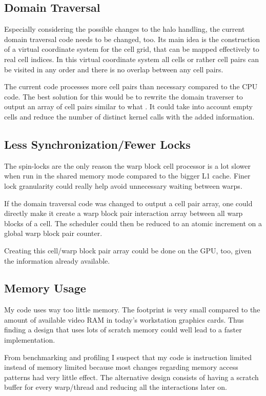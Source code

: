 \subsection{Domain Traversal}
Especially considering the possible changes to the halo handling, the current domain traversal code needs to be changed, too. Its main idea is the construction of a virtual coordinate system for the cell grid, that can be mapped effectively to real cell indices. In this virtual coordinate system all cells or rather cell pairs can be visited in any order and there is no overlap between any cell pairs.

The current code processes more cell pairs than necessary compared to the CPU code. The best solution for this would be to rewrite the domain traverser to output an array of cell pairs similar to what \cite{orend10numerische}. It could take into account empty cells and reduce the number of distinct kernel calls with the added information.

\subsection{Less Synchronization/Fewer Locks}
The spin-locks are the only reason the warp block cell processor is a lot slower when run in the shared memory mode compared to the bigger L1 cache. Finer lock granularity could really help avoid unnecessary waiting between warps.

If the domain traversal code was changed to output a cell pair array, one could directly make it create a warp block pair interaction array between all warp blocks of a cell. The scheduler could then be reduced to an atomic increment on a global warp block pair counter.

Creating this cell/warp block pair array could be done on the GPU, too, given the information already available.

\subsection{Memory Usage}
My code uses way too little memory. The footprint is very small compared to the amount of available video RAM in today's workstation graphics cards. Thus finding a design that uses lots of scratch memory could well lead to a faster implementation.

From benchmarking and profiling I suspect that my code is instruction limited instead of memory limited because most changes regarding memory access patterns had very little effect. The alternative design consists of having a scratch buffer for every warp/thread and reducing all the interactions later on.


